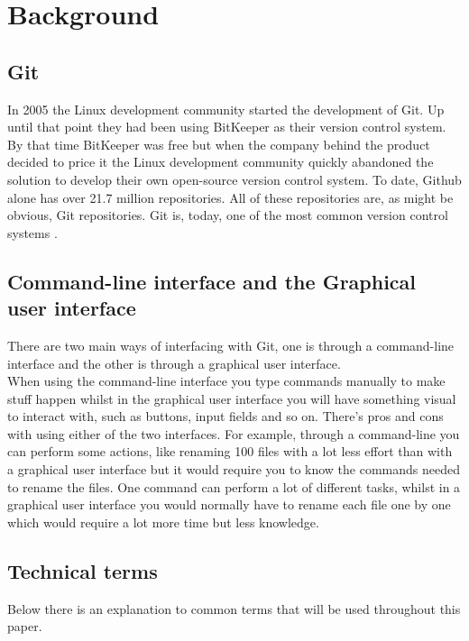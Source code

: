 \documentclass[12pt,a4paper,article,compsoc]{IEEEtran}
\begin{document}
		\section{Background}
			\subsection{Git}
			In 2005 the Linux development community started the development of Git.
			Up until that point they had been using BitKeeper as their version control system. By that time BitKeeper was free but when the company behind the product decided to price it the Linux development community quickly abandoned the solution to develop their own open-source version control system.\cite{ProGit}
			To date, Github alone has over 21.7 million repositories.\cite{GithubAbout} All of these repositories are, as might be obvious, Git repositories. 
			Git is, today, one of the most common version control systems \cite{EclipseDeveoperReport}\cite{DeveloperProductivity}\cite{MicrosoftSurveyResults}.
			
			\subsection{Command-line interface and the Graphical user interface}
			There are two main ways of interfacing with Git, one is through a command-line interface and the other is through a graphical user interface.\\
			When using the command-line interface you type commands manually to make stuff happen whilst in the graphical user interface you will have something visual to interact with, such as buttons, input fields and so on.
			There's pros and cons with using either of the two interfaces.
			For example, through a command-line you can perform some actions, like renaming 100 files with a lot less effort than with a graphical user interface but it would require you to know the commands needed to rename the files. One command can perform a lot of different tasks, whilst in a graphical user interface you would normally have to rename each file one by one which would require a lot more time but less knowledge.
			
			\subsection{Technical terms}
			Below there is an explanation to common terms that will be used throughout this paper.
			
\end{document}
